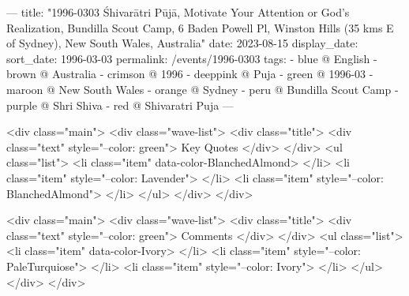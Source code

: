 ---
title: "1996-0303 Śhivarātri Pūjā, Motivate Your Attention or God's Realization, Bundilla Scout Camp, 6 Baden Powell Pl, Winston Hills (35 kms E of Sydney), New South Wales, Australia"
date: 2023-08-15
display_date: 
sort_date: 1996-03-03
permalink: /events/1996-0303
tags:
  - blue @ English
  - brown @ Australia
  - crimson @ 1996
  - deeppink @ Puja
  - green @ 1996-03
  - maroon @ New South Wales
  - orange @ Sydney
  - peru @ Bundilla Scout Camp
  - purple @ Shri Shiva
  - red @ Shivaratri Puja
---

<div class="main">
  <div class="wave-list">
    <div class="title">
      <div class="text" style="--color: green">
        Key Quotes
      </div>
    </div>
    <ul class="list">
        <li class="item" data-color-BlanchedAlmond>
        </li>
        <li class="item" style="--color: Lavender">
        </li>
        <li class="item" style="--color: BlanchedAlmond">
        </li>
      </ul>
  </div>
</div>

<div class="main">
  <div class="wave-list">
    <div class="title">
      <div class="text" style="--color: green">
        Comments
      </div>
    </div>
    <ul class="list">
        <li class="item" data-color-Ivory>
        </li>
        <li class="item" style="--color: PaleTurquiose">
        </li>
        <li class="item" style="--color: Ivory">
        </li>
      </ul>
  </div>
</div>